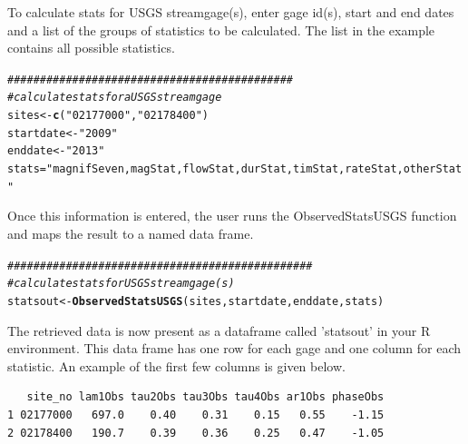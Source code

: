 \documentclass[a4paper,11pt]{article}\usepackage[]{graphicx}\usepackage[]{color}
\makeatletter
\newcommand{\hlstr}[1]{\textcolor[rgb]{0.192,0.494,0.8}{#1}}%
\newcommand{\hlcom}[1]{\textcolor[rgb]{0.678,0.584,0.686}{\textit{#1}}}%
\newcommand{\hlstd}[1]{\textcolor[rgb]{0.345,0.345,0.345}{#1}}%
\newcommand{\hlkwb}[1]{\textcolor[rgb]{0.69,0.353,0.396}{#1}}%
\newcommand{\hlkwd}[1]{\textcolor[rgb]{0.737,0.353,0.396}{\textbf{#1}}}%
\newenvironment{kframe}{%
 \def\at@end@of@kframe{}%
 \ifinner\ifhmode%
  \def\at@end@of@kframe{\end{minipage}}%
  \begin{minipage}{\columnwidth}%
 \fi\fi%
 \def\FrameCommand##1{\hskip\@totalleftmargin \hskip-\fboxsep
 \colorbox{shadecolor}{##1}\hskip-\fboxsep
     \hskip-\linewidth \hskip-\@totalleftmargin \hskip\columnwidth}%
 \MakeFramed {\advance\hsize-\width
   \@totalleftmargin\z@ \linewidth\hsize
   \@setminipage}}%
 {\par\unskip\endMakeFramed%
 \at@end@of@kframe}
\newenvironment{knitrout}{}{} %
\makeatother
\begin{document}
To calculate stats for USGS streamgage(s), enter gage id(s), start and end dates and a list of the groups of statistics to be calculated. The list in the example contains all possible statistics.

\begin{knitrout}
\color{fgcolor}\begin{kframe}
\begin{alltt}
\hlcom{############################################}
\hlcom{# calculate stats for a USGS streamgage}
\hlstd{sites} \hlkwb{<-} \hlkwd{c}\hlstd{(}\hlstr{"02177000"}\hlstd{,}\hlstr{"02178400"}\hlstd{)}
\hlstd{startdate} \hlkwb{<-} \hlstr{"2009"}
\hlstd{enddate} \hlkwb{<-} \hlstr{"2013"}
\hlstd{stats}\hlkwb{=}\hlstr{"magnifSeven,magStat,flowStat,durStat,timStat,rateStat,otherStat"}
\end{alltt}
\end{kframe}
\end{knitrout}

Once this information is entered, the user runs the ObservedStatsUSGS function and maps the result to a named data frame.



\begin{knitrout}
\color{fgcolor}\begin{kframe}
\begin{alltt}
\hlcom{###############################################}
\hlcom{# calculate stats for USGS streamgage(s)}
\hlstd{statsout} \hlkwb{<-} \hlkwd{ObservedStatsUSGS}\hlstd{(sites,startdate,enddate,stats)}
\end{alltt}
\end{kframe}
\end{knitrout}

The retrieved data is now present as a dataframe called 'statsout' in your R environment. This data frame has one row for each gage and one column for each statistic. An example of the first few columns is given below.

\begin{knitrout}
\color{fgcolor}\begin{kframe}
\begin{verbatim}
   site_no lam1Obs tau2Obs tau3Obs tau4Obs ar1Obs phaseObs
1 02177000   697.0    0.40    0.31    0.15   0.55    -1.15
2 02178400   190.7    0.39    0.36    0.25   0.47    -1.05
\end{verbatim}
\end{kframe}
\end{knitrout}
\end{document}
